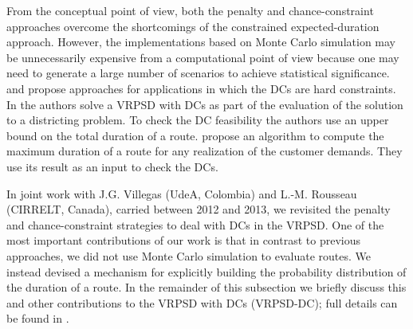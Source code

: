 From the conceptual point of view, both the penalty and chance-constraint approaches overcome the shortcomings of the constrained expected-duration approach. However, the implementations based on Monte Carlo simulation may be unnecessarily expensive from a computational point of view because one may need to generate a large number of scenarios to achieve statistical significance. \citet{Haugland2007} and \citet{Erera2010} propose approaches for applications in which the DCs are hard constraints. In \cite{Haugland2007} the authors solve a VRPSD with DCs as part of the evaluation of the solution to a districting problem. To check the DC feasibility the authors use an upper bound on the total duration of a route. \citet{Erera2010} propose an algorithm to compute the maximum duration of a route for any realization of the customer demands. They use its result as an input to check the DCs.

In joint work with J.G. Villegas (UdeA, Colombia) and L.-M. Rousseau (CIRRELT, Canada), carried between 2012 and 2013, we revisited the penalty and chance-constraint strategies to deal with DCs in the VRPSD. One of the most important contributions of our work is that in contrast to previous approaches, we did not use Monte Carlo simulation to evaluate routes. We instead devised a mechanism for explicitly building the probability distribution of the duration of a route. In the remainder of this subsection we briefly discuss this and other contributions to the VRPSD with DCs (VRPSD-DC); full details can be found in \citep{Mendoza2015}.

